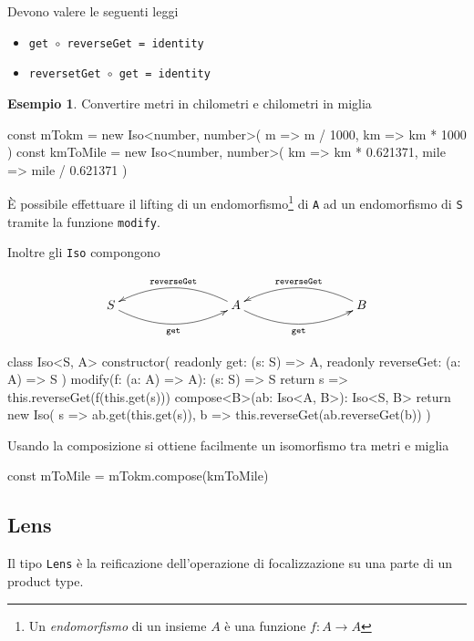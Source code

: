 \documentclass[12pt]{article}
\theoremstyle{definition}
\newtheorem{example}{Esempio}[section]
\newenvironment{code}
  {\vspace{0.5cm} \VerbatimEnvironment\begin{typescriptcode}}
  {\end{typescriptcode} \vspace{0.2cm}}
\begin{document}
Devono valere le seguenti leggi

\begin{itemize}
  \item \texttt{get $\circ$ reverseGet = identity}
  \item \texttt{reversetGet $\circ$ get = identity}
\end{itemize}

\begin{example}

Convertire metri in chilometri e chilometri in miglia

\begin{code}
const mTokm = new Iso<number, number>(
  m => m / 1000,
  km => km * 1000
)
const kmToMile = new Iso<number, number>(
  km => km * 0.621371,
  mile => mile / 0.621371
)
\end{code}
\end{example}

È possibile effettuare il lifting di un endomorfismo\footnote{Un \emph{endomorfismo} di un insieme $A$ è una funzione $f: A \rightarrow A$}
di \texttt{A} ad un endomorfismo di \texttt{S} tramite la funzione \texttt{modify}.

Inoltre gli \texttt{Iso} compongono

\[
\xymatrixrowsep{3cm}
\xymatrixcolsep{3cm}
\xymatrix{
  S \ar@/_0.5cm/[r]_{\texttt{get}} & A \ar@/_0.5cm/[l]_{\texttt{reverseGet}} \ar@/_0.5cm/[r]_{\texttt{get}} & B \ar@/_0.5cm/[l]_{\texttt{reverseGet}}
}
\]

\begin{code}
class Iso<S, A> {
  constructor(
    readonly get: (s: S) => A,
    readonly reverseGet: (a: A) => S
  ) {}
  modify(f: (a: A) => A): (s: S) => S {
    return s => this.reverseGet(f(this.get(s)))
  }
  compose<B>(ab: Iso<A, B>): Iso<S, B> {
    return new Iso(
      s => ab.get(this.get(s)),
      b => this.reverseGet(ab.reverseGet(b))
    )
  }
}
\end{code}

Usando la composizione si ottiene facilmente un isomorfismo tra metri e miglia

\begin{code}
const mToMile = mTokm.compose(kmToMile)
\end{code}

\subsection{Lens}

Il tipo \texttt{Lens} è la reificazione dell'operazione di focalizzazione su una parte di un product type.
\end{document}
